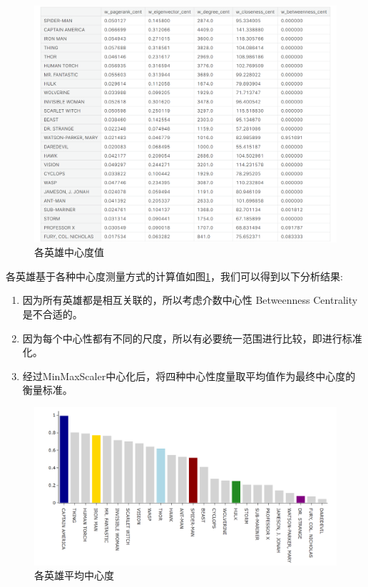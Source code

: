 \documentclass[12pt]{xjtureport}
\begin{document}
\begin{figure}[!htbp]
    \centering
    \includegraphics[width=\linewidth]{figures/中心度可视化.png}
    \caption{各英雄中心度值}
    \label{central}
\end{figure}

各英雄基于各种中心度测量方式的计算值如图\ref{central}，我们可以得到以下分析结果:

\begin{enumerate}
    \item 因为所有英雄都是相互关联的，所以考虑介数中心性 Betweenness Centrality是不合适的。
    \item 因为每个中心性都有不同的尺度，所以有必要统一范围进行比较，即进行标准化。
    \item 经过MinMaxScaler中心化后，将四种中心性度量取平均值作为最终中心度的衡量标准。
\end{enumerate}

\begin{figure}[!htbp]
    \centering
    \includegraphics[width=\linewidth]{figures/平均中心度可视化.png}
    \caption{各英雄平均中心度}
    \label{central_mean}
\end{figure}
\end{document}
